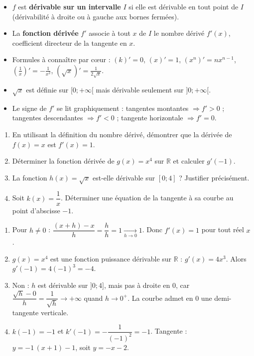 \documentclass[11pt]{article}
\begin{document}
\begin{aretenir}
\begin{itemize}
\item $f$ est \textbf{dérivable sur un intervalle} $I$ si elle est dérivable en tout point de $I$ (dérivabilité à droite ou à gauche aux bornes fermées).
\item La \textbf{fonction dérivée} $f'$ associe à tout $x$ de $I$ le nombre dérivé $f'(x)$, coefficient directeur de la tangente en $x$.
\item Formules à connaître par cœur : $(k)' = 0$, $(x)' = 1$, $(x^n)' = n x^{n-1}$, $\left(\frac{1}{x}\right)' = -\frac{1}{x^2}$, $(\sqrt{x})' = \frac{1}{2\sqrt{x}}$.
\item $\sqrt{x}$ est définie sur $[0 ; +\infty[$ mais dérivable seulement sur $]0 ; +\infty[$.
\item Le signe de $f'$ se lit graphiquement : tangentes montantes $\Rightarrow f' > 0$ ; tangentes descendantes $\Rightarrow f' < 0$ ; tangente horizontale $\Rightarrow f' = 0$.
\end{itemize}
\end{aretenir}

\begin{exercice}
\begin{enumerate}
\item En utilisant la définition du nombre dérivé, démontrer que la dérivée de $f(x) = x$ est $f'(x) = 1$.
\item Déterminer la fonction dérivée de $g(x) = x^4$ sur $\mathbb{R}$ et calculer $g'(-1)$.
\item La fonction $h(x) = \sqrt{x}$ est-elle dérivable sur $[0 ; 4]$ ? Justifier précisément.
\item Soit $k(x) = \dfrac{1}{x}$. Déterminer une équation de la tangente à sa courbe au point d'abscisse $-1$.
\end{enumerate}
\end{exercice}

\begin{corrige}[Exercice]
\begin{enumerate}
\item Pour $h \neq 0$ : $\dfrac{(x+h)-x}{h} = \dfrac{h}{h} = 1 \xrightarrow[h \to 0]{} 1$. Donc $f'(x) = 1$ pour tout réel $x$.
\item $g(x) = x^4$ est une fonction puissance dérivable sur $\mathbb{R}$ : $g'(x) = 4x^3$. Alors $g'(-1) = 4(-1)^3 = -4$.
\item Non : $h$ est dérivable sur $]0 ; 4]$, mais pas à droite en $0$, car $\dfrac{\sqrt{h}-0}{h} = \dfrac{1}{\sqrt{h}} \to +\infty$ quand $h \to 0^+$. La courbe admet en $0$ une demi-tangente verticale.
\item $k(-1) = -1$ et $k'(-1) = -\dfrac{1}{(-1)^2} = -1$. Tangente : $y = -1\,(x+1) - 1$, soit $y = -x - 2$.
\end{enumerate}
\end{corrige}
\end{document}

